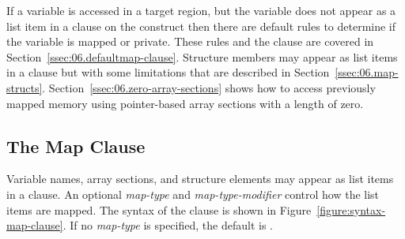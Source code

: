 If a variable is accessed in a target
region, but the variable does not appear as a list item in a  clause
on the construct then there are default rules to determine if the variable is
mapped or private.  These rules and the  clause are covered in
Section~\ref{ssec:06.defaultmap-clause}.  Structure members may appear as list
items in a  clause but with some limitations that are described in
Section~\ref{ssec:06.map-structs}.
Section~\ref{ssec:06.zero-array-sections} shows how to access
previously mapped memory using pointer-based array sections with a length of
zero.



\subsection{The Map Clause}
\label{sec:06.map-clause}

Variable names, array sections, and structure elements may appear as list items
in a  clause.  An optional \emph{map-type} and 
\emph{map-type-modifier} control how the list items are mapped.  The syntax of
the  clause is shown in Figure~\ref{figure:syntax-map-clause}.  If no
\emph{map-type} is specified, the default is .

